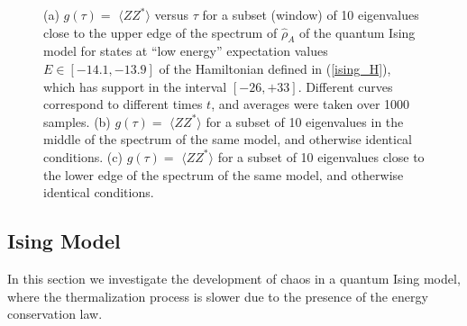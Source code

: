 \documentclass[aps,prb,preprint,onecolumn,amsmath,amssymb,superscriptaddress,eqsecnum,floatfix,scrartcl]{revtex4-1}
\begin{document}
\begin{figure}[hbt]
\centering
\caption{
(a) $g(\tau)=$ $\langle ZZ^*\rangle$ versus $\tau$ for a subset (window)  of 10 eigenvalues  close to the upper edge 
of the spectrum of ${\hat \rho}_A$ of the quantum Ising model for states at ``low energy''  expectation values  $E\in [-14.1, -13.9]$ of the Hamiltonian defined in
(\ref{ising_H}), which has support in the interval $[-26, +33]$. Different curves correspond to  different times $t$, and  averages were taken over 1000 samples. (b)  $g(\tau)=$ $\langle ZZ^*\rangle$ for a subset of 10 eigenvalues in the middle of the spectrum of the same model, and otherwise identical conditions. (c)  $g(\tau)=$ $\langle ZZ^*\rangle$ for a subset of 10 eigenvalues close to the lower edge of the spectrum of the same model, and otherwise identical conditions.
} 
\label{fig:Ising_ME}
\end{figure}








\subsection{Ising Model}
In this section we investigate the 
development of chaos  in a quantum 
Ising model, where the thermalization process is slower due to the
presence of the energy conservation law.
\end{document}
